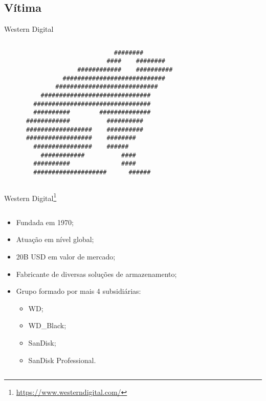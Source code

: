 \documentclass[bookmarks=false,aspectratio=169,9pt]{beamer}
\begin{document}
\subsection{Vítima}
\begin{frame}[fragile]{Western Digital}
	\begin{columns}
		\begin{column}{0.5\textwidth}
			\begin{verbatim}
                              ########
                            ####    ########
                    ############    ##########
                ############################
              ############################
          ##############################
        ################################
        ##########        ##############
      ############          ##########
      ##################    ##########
      ##################    ########
        ################    ######
          ############          ####
        ##########              ####
        ####################      ######
\end{verbatim}
		\end{column}
	\end{columns}
\end{frame}
\begin{frame}{Western Digital\footnote{\href{https://www.westerndigital.com/}{https://www.westerndigital.com/}}}
	\begin{columns}
		\begin{column}{0.5\textwidth}
			\begin{itemize}
				\item Fundada em 1970;
				\item Atuação em nível global;
				\item 20B USD em valor de mercado;
				\item Fabricante de diversas soluções de armazenamento;
				\item Grupo formado por mais 4 subsidiárias:
				      \begin{itemize}
					      \item WD;
					      \item WD\_Black;
					      \item SanDisk;
					      \item SanDisk Professional.
				      \end{itemize}
			\end{itemize}
		\end{column}
	\end{columns}
\end{frame}
\end{document}
